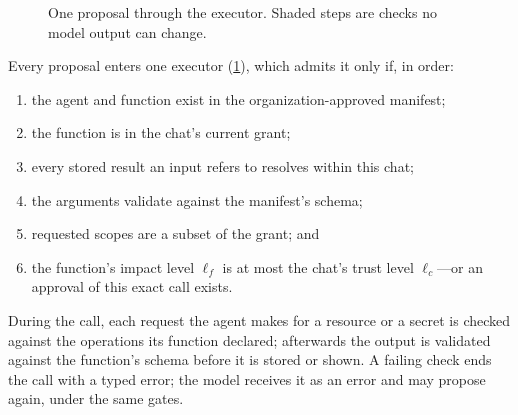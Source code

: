 \documentclass[10pt,twocolumn,a4paper]{article}
\newcommand{\code}[1]{\texttt{\small #1}}
\begin{document}
\begin{figure}[t]
\centering
{}
\caption{One proposal through the executor. Shaded steps are checks no
model output can change.}
\label{fig:call}
\end{figure}

Every proposal enters one executor (\cref{fig:call}), which admits it only if, in order:
\begin{enumerate}[label=\textbf{E\arabic*},leftmargin=2.1em]
  \item the agent and function exist in the organization-approved manifest;
  \item the function is in the chat's current grant;
  \item every stored result an input refers to resolves within this chat;
  \item the arguments validate against the manifest's schema;
  \item requested scopes are a subset of the grant; and
  \item the function's impact level $\ell_f$ is at most the chat's trust
  level $\ell_c$---or an approval of this exact call exists.
\end{enumerate}
During the call, each request the agent makes for a resource or a
secret is checked against the operations its function declared;
afterwards the output is validated against the function's schema
before it is stored or shown. A failing check ends the call with a
typed error; the model receives it as an error and may propose again,
under the same gates.
\end{document}
